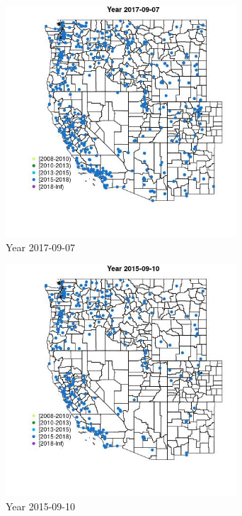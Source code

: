 \begin{figure} 
\centering  
\includegraphics[width=0.77\textwidth]{Code_Outputs/Report_ML_input_PM25_Step4_part_e_de_duplicated_aveswNAs_MapObsYear2017-09-07.jpg} 
\caption{\label{fig:Report_ML_input_PM25_Step4_part_e_de_duplicated_aveswNAsMapObsYear2017-09-07}Year 2017-09-07} 
\end{figure} 
 

\begin{figure} 
\centering  
\includegraphics[width=0.77\textwidth]{Code_Outputs/Report_ML_input_PM25_Step4_part_e_de_duplicated_aveswNAs_MapObsYear2015-09-10.jpg} 
\caption{\label{fig:Report_ML_input_PM25_Step4_part_e_de_duplicated_aveswNAsMapObsYear2015-09-10}Year 2015-09-10} 
\end{figure} 
 

